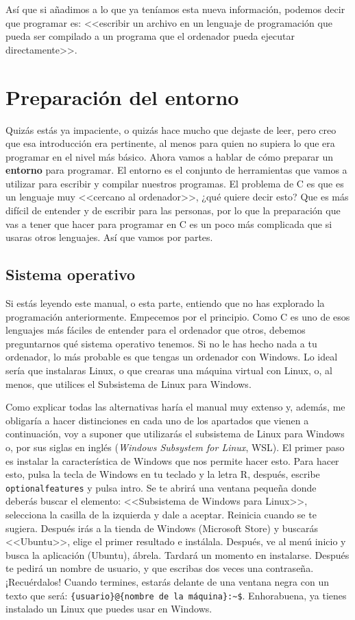\documentclass[a4paper]{article}
\begin{document}
Así que si añadimos a lo que ya teníamos esta nueva información, podemos decir
que programar es: <<escribir un archivo en un lenguaje de programación que
pueda ser compilado a un programa que el ordenador pueda ejecutar
directamente>>.
\section{Preparación del entorno}
Quizás estás ya impaciente, o quizás hace mucho que dejaste de leer, pero creo
que esa introducción era pertinente, al menos para quien no supiera lo que era
programar en el nivel más básico. Ahora vamos a hablar de cómo preparar
un \textbf{entorno} para programar. El entorno es el conjunto de herramientas
que vamos a utilizar para escribir y compilar nuestros programas.
El problema de C es que es un lenguaje muy <<cercano al ordenador>>, ¿qué quiere
decir esto? Que es más difícil de entender y de escribir para las personas, por
lo que la preparación que vas a tener que hacer para programar en C es un poco
más complicada que si usaras otros lenguajes. Así que vamos por partes.

\subsection{Sistema operativo}
Si estás leyendo este manual, o esta parte, entiendo que no has explorado la
programación anteriormente.
Empecemos por el principio. Como C es uno de esos lenguajes más
fáciles de entender para el ordenador que otros, debemos preguntarnos qué
sistema operativo tenemos. Si no le has hecho nada a tu ordenador, lo más
probable es que tengas un ordenador con Windows. Lo ideal sería que instalaras
Linux, o que crearas una máquina virtual con Linux, o, al menos, que utilices
el Subsistema de Linux para Windows.

Como explicar todas las alternativas haría el manual muy extenso y, además, me
obligaría a hacer distinciones en cada uno de los apartados que vienen a
continuación, voy a suponer que utilizarás el subsistema de Linux para Windows
o, por sus siglas en inglés (\textit{Windows Subsystem for Linux}, WSL). El
primer paso es instalar la característica de Windows que nos permite hacer esto.
Para hacer esto, pulsa la tecla de Windows en tu teclado y la letra R, después,
escribe \verb!optionalfeatures! y pulsa intro. Se te abrirá una ventana
pequeña donde deberás buscar el elemento: <<Subsistema de Windows para Linux>>,
selecciona la casilla de la izquierda y dale a aceptar. Reinicia cuando se te
sugiera. Después irás a la tienda de Windows (Microsoft Store) y buscarás
<<Ubuntu>>, elige el primer resultado e instálala. Después, ve al menú inicio y
busca la aplicación (Ubuntu), ábrela. Tardará un momento en instalarse. Después
te pedirá un nombre de usuario, y que escribas dos veces una contraseña.
¡Recuérdalos! Cuando termines, estarás delante de una ventana negra con un
texto que será: \verb!{usuario}@{nombre de la máquina}:~$!. Enhorabuena, ya
tienes instalado un Linux que puedes usar en Windows.
\end{document}
